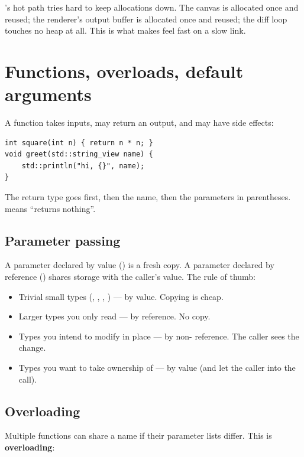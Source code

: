 \maya{}'s hot path tries hard to keep allocations down. The canvas
is allocated once and reused; the renderer's output buffer is
allocated once and reused; the diff loop touches no heap at all.
This is what makes \maya{} feel fast on a slow link.

\section{Functions, overloads, default arguments}
\label{sec:cpp:functions}

A function takes inputs, may return an output, and may have side
effects:

\begin{lstlisting}
int square(int n) { return n * n; }
void greet(std::string_view name) {
    std::println("hi, {}", name);
}
\end{lstlisting}

The return type goes first, then the name, then the parameters in
parentheses.  means ``returns nothing''.

\subsection{Parameter passing}

A parameter declared by value () is a fresh copy. A
parameter declared by reference () shares storage
with the caller's value. The rule of thumb:

\begin{itemize}[leftmargin=*]
  \item Trivial small types (, ,
    , ) --- by value.
    Copying is cheap.
  \item Larger types you only read --- by  reference.
    No copy.
  \item Types you intend to modify in place --- by non-
    reference. The caller sees the change.
  \item Types you want to take ownership of --- by value (and let
    the caller  into the call).
\end{itemize}

\subsection{Overloading}

Multiple functions can share a name if their parameter lists differ.
This is \textbf{overloading}:


